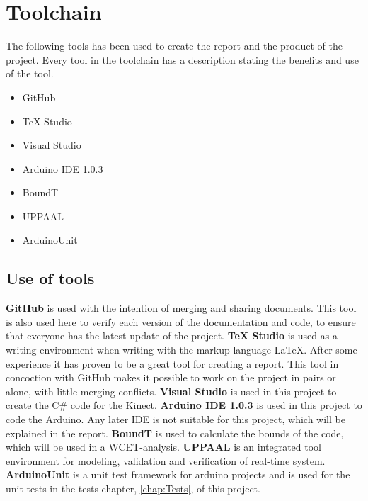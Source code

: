 \chapter{Toolchain}
The following tools has been used to create the report and the product of the project. Every tool in the toolchain has a description stating the benefits and use of the tool.


\begin{itemize}
	\item GitHub
	\item TeX Studio
	\item Visual Studio
	\item Arduino IDE 1.0.3
	\item BoundT
	\item UPPAAL
	\item ArduinoUnit
\end{itemize}


\section*{Use of tools}
\textbf{GitHub} is used with the intention of merging and sharing documents. This tool is also used here to verify each version of the documentation and code, to ensure that everyone has the latest update of the project.\newline
\textbf{TeX Studio} is used as a writing environment when writing with the markup language LaTeX. After some experience it has proven to be a great tool for creating a report. This tool in concoction with GitHub makes it possible to work on the project in pairs or alone, with little merging conflicts. \newline
\textbf{Visual Studio} is used in this project to create the C\# code for the Kinect. \newline
\textbf{Arduino IDE 1.0.3} is used in this project to code the Arduino. Any later IDE is not suitable for this project, which will be explained in the report. \newline
\textbf{BoundT} is used to calculate the bounds of the code, which will be used in a WCET-analysis. \citep{boundt} \newline
\textbf{UPPAAL} is an integrated tool environment for modeling, validation and verification of real-time system. \citep{uppaal} \newline
\textbf{ArduinoUnit} is a unit test framework for arduino projects and is used for the unit tests in the tests chapter, \ref{chap:Tests}, of this project. \citep{au}


